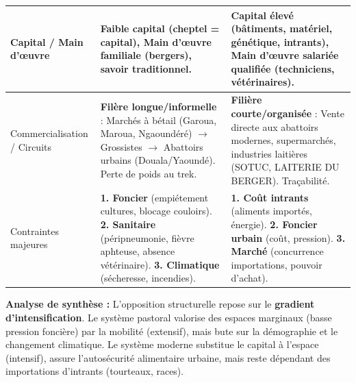 \documentclass[11pt]{article}
\begin{document}
\begin{exoresolu}
\begin{center}
\begin{tabularx}{\linewidth}{|l|X|X|}
Capital / Main d'œuvre & \textbf{Faible capital} (cheptel = capital), \textbf{Main d'œuvre familiale} (bergers), savoir traditionnel. & \textbf{Capital élevé} (bâtiments, matériel, génétique, intrants), \textbf{Main d'œuvre salariée} qualifiée (techniciens, vétérinaires). \\ \hline
Commercialisation / Circuits & \textbf{Filère longue/informelle} : Marchés à bétail (Garoua, Maroua, Ngaoundéré) $\to$ Grossistes $\to$ Abattoirs urbains (Douala/Yaoundé). Perte de poids au trek. & \textbf{Filière courte/organisée} : Vente directe aux abattoirs modernes, supermarchés, industries laitières (SOTUC, LAITERIE DU BERGER). Traçabilité. \\ \hline
Contraintes majeures & \textbf{1. Foncier} (empiétement cultures, blocage couloirs). \textbf{2. Sanitaire} (péripneumonie, fièvre aphteuse, absence vétérinaire). \textbf{3. Climatique} (sécheresse, incendies). & \textbf{1. Coût intrants} (aliments importés, énergie). \textbf{2. Foncier urbain} (coût, pression). \textbf{3. Marché} (concurrence importations, pouvoir d'achat). \\ \hline
\end{tabularx}
\end{center}
\textbf{Analyse de synthèse :} L'opposition structurelle repose sur le \textbf{gradient d'intensification}. Le système pastoral valorise des espaces marginaux (basse pression foncière) par la mobilité (extensif), mais bute sur la démographie et le changement climatique. Le système moderne substitue le capital à l'espace (intensif), assure l'autosécurité alimentaire urbaine, mais reste dépendant des importations d'intrants (tourteaux, races).
\end{exoresolu}
\end{document}
